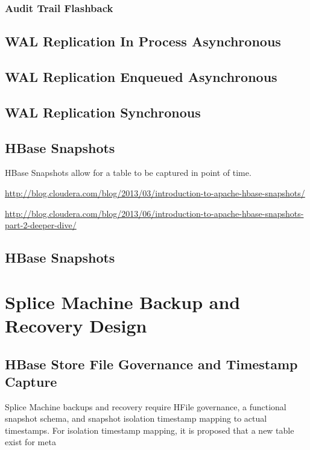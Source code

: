 \subsubsection{Audit Trail Flashback}

\subsection{WAL Replication In Process Asynchronous }

\subsection{WAL Replication Enqueued Asynchronous }

\subsection{WAL Replication Synchronous }

\subsection{HBase Snapshots}

HBase Snapshots allow for a table to be captured in point of time.

\url{http://blog.cloudera.com/blog/2013/03/introduction-to-apache-hbase-snapshots/}

\url{http://blog.cloudera.com/blog/2013/06/introduction-to-apache-hbase-snapshots-part-2-deeper-dive/}

\subsection{HBase Snapshots}

\section{Splice Machine Backup and Recovery Design}

\subsection{HBase Store File Governance and Timestamp Capture}

Splice Machine backups and recovery require HFile governance, a functional
snapshot schema, and snapshot isolation timestamp mapping to actual timestamps. 
For isolation timestamp mapping, it is proposed that a new table exist for meta






